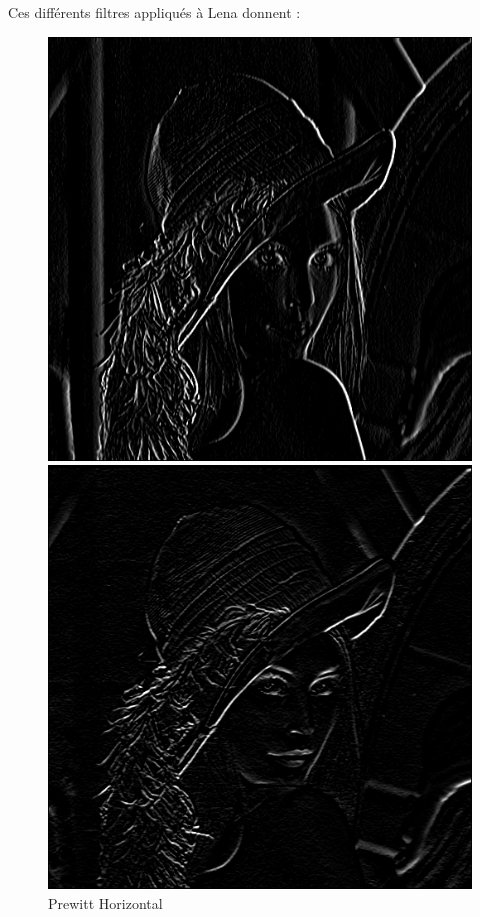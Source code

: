 \documentclass[11pt]{article}
\begin{document}
	Ces différents filtres appliqués à Lena donnent : 

	\begin{figure}[H]
		\begin{minipage}[c]{.46\linewidth}
			\centering
			\includegraphics[scale=0.25]{Image/filtrePrewittHorizontal.png}
			\caption{Prewitt Horizontal}
			\label{fig:PrewittHorizontal}
		\end{minipage} \hfill
		\begin{minipage}[c]{.46\linewidth}
		\centering
			\includegraphics[scale=0.25]{Image/filtrePrewittVertical.png}

\end{minipage}
\end{figure}
\end{document}
